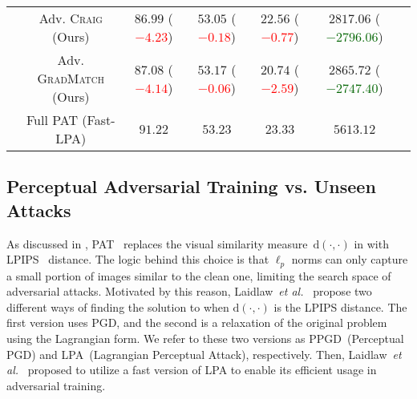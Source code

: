 \documentclass[runningheads]{llncs}
\newcommand{\etal}{\textit{et al.}}
\begin{document}
\begin{table}[t!]
\begin{center}
\begin{scriptsize}
\begin{tabular}{ccccccc}
				\midrule
				\multirow{3}{*}{\rotatebox[origin=c]{90}{\textbf{ImageNet}}}
				& Adv. \textsc{Craig} (Ours)             & $86.99$ (\textcolor{red}{$-4.23$})         & $53.05$ (\textcolor{red}{$-0.18$})    & $22.56$ (\textcolor{red}{$-0.77$})   & $2817.06$ (\textcolor{darkgreen}{$-2796.06$}) \\
				& Adv. \textsc{GradMatch} (Ours)         & $87.08$ (\textcolor{red}{$-4.14$}) 	      & $53.17$ (\textcolor{red}{$-0.06$})    & $20.74$ (\textcolor{red}{$-2.59$})   & $2865.72$ (\textcolor{darkgreen}{$-2747.40$}) \\
				& Full PAT (Fast-LPA)                    & $91.22$	                                  & $53.23$                               & $23.33$                              & $5613.12$ \\
				\bottomrule
			\end{tabular}
		\end{scriptsize}
	\end{center}
\end{table}

\subsection{Perceptual Adversarial Training vs. Unseen Attacks}
As discussed in , PAT~\cite{laidlaw2021pat} replaces the visual similarity measure~$\mathrm{d}(\cdot, \cdot)$ in  with LPIPS~\cite{zhang2018lpips} distance.
The logic behind this choice is that $\ell_p$ norms can only capture a small portion of images similar to the clean one, limiting the search space of adversarial attacks.
Motivated by this reason, Laidlaw~\etal~\cite{laidlaw2021pat} propose two different ways of finding the solution to  when $\mathrm{d}(\cdot, \cdot)$ is the LPIPS distance.
The first version uses PGD, and the second is a relaxation of the original problem using the Lagrangian form.
We refer to these two versions as PPGD~(Perceptual PGD) and LPA~(Lagrangian Perceptual Attack), respectively.
Then, Laidlaw~\etal~\cite{laidlaw2021pat} proposed to utilize a fast version of LPA to enable its efficient usage in adversarial training.
\end{document}
